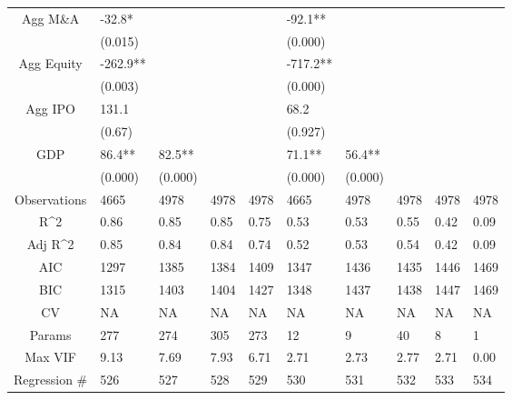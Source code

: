 \documentclass{article}
\begin{document}
\begin{table}[H]
\begin{tabular}{|clllllllll|}
  Agg M\&A & -32.8* &  &  &  & -92.1** &  &  &  &  \\
   & (0.015) &  &  &  & (0.000) &  &  &  &  \\
  Agg Equity & -262.9** &  &  &  & -717.2** &  &  &  &  \\
   & (0.003) &  &  &  & (0.000) &  &  &  &  \\
  Agg IPO & 131.1 &  &  &  & 68.2 &  &  &  &  \\
   & (0.67) &  &  &  & (0.927) &  &  &  &  \\
  GDP & 86.4** & 82.5** &  &  & 71.1** & 56.4** &  &  &  \\
   & (0.000) & (0.000) &  &  & (0.000) & (0.000) &  &  &  \\
  \hline
 Observations & 4665 & 4978 & 4978 & 4978 & 4665 & 4978 & 4978 & 4978 & 4978 \\
  R^2 & 0.86 & 0.85 & 0.85 & 0.75 & 0.53 & 0.53 & 0.55 & 0.42 & 0.09 \\
  Adj R^2 & 0.85 & 0.84 & 0.84 & 0.74 & 0.52 & 0.53 & 0.54 & 0.42 & 0.09 \\
  AIC & 1297 & 1385 & 1384 & 1409 & 1347 & 1436 & 1435 & 1446 & 1469 \\
  BIC & 1315 & 1403 & 1404 & 1427 & 1348 & 1437 & 1438 & 1447 & 1469 \\
  CV & NA & NA & NA & NA & NA & NA & NA & NA & NA \\
  Params & 277 & 274 & 305 & 273 & 12 & 9 & 40 & 8 & 1 \\
  Max VIF & 9.13 & 7.69 & 7.93 & 6.71 & 2.71 & 2.73 & 2.77 & 2.71 & 0.00 \\
  Regression \# & 526 & 527 & 528 & 529 & 530 & 531 & 532 & 533 & 534 \\
   \hline
\end{tabular}

\end{table}
\end{document}
